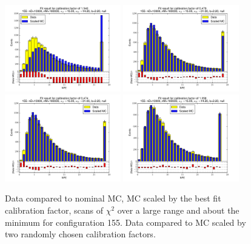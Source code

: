 \begin{figure}[htbp]
\begin{center}
\includegraphics[width=0.45\textwidth]{../FIGURES/155/FIG_Fit_result_for_calibration_factor_of_1_540.pdf} 
\includegraphics[width=0.45\textwidth]{../FIGURES/155/FIG_Fit_result_for_calibration_factor_of_0_479.pdf} 
\includegraphics[width=0.45\textwidth]{../FIGURES/155/FIG_Fit_result_for_calibration_factor_of_0_474.pdf} 
\includegraphics[width=0.45\textwidth]{../FIGURES/155/FIG_Fit_result_for_calibration_factor_of_1_058.pdf} 
\caption{Data compared to nominal MC, MC scaled by the best fit calibration factor, scans of $\chi^2$ over a large range and about the minimum for configuration 155. Data compared to MC scaled by two randomly chosen calibration factors.} 
\label{tab:best_155} 
\end{center} \end{figure} 

